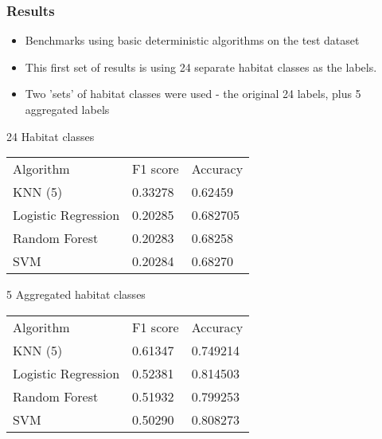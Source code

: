 \documentclass{beamer}
\begin{document}
\begin{frame}
    \frametitle{Results}

    \begin{itemize}
        \item Benchmarks using basic deterministic algorithms on the test dataset
        \item This first set of results is using 24 separate habitat classes as the labels.
        \item Two 'sets' of habitat classes were used - the original 24 labels, plus 5 aggregated labels
    \end{itemize}

    {\scriptsize
    24 Habitat classes

    \begin{tabular}{| l | l | l |}
        Algorithm           & F1 score & Accuracy \\
        KNN (5)             & 0.33278 & 0.62459 \\
        Logistic Regression & 0.20285 & 0.682705 \\
        Random Forest       & 0.20283 & 0.68258 \\
        SVM                 & 0.20284 & 0.68270 \\
    \end{tabular}

    5 Aggregated habitat classes

    \begin{tabular}{| l | l | l |}
        Algorithm           & F1 score & Accuracy \\
        KNN (5)             & 0.61347 & 0.749214 \\
        Logistic Regression & 0.52381 & 0.814503 \\
        Random Forest       & 0.51932 & 0.799253 \\
        SVM                 & 0.50290 & 0.808273 \\
    \end{tabular}
    }
\end{frame}
\end{document}
